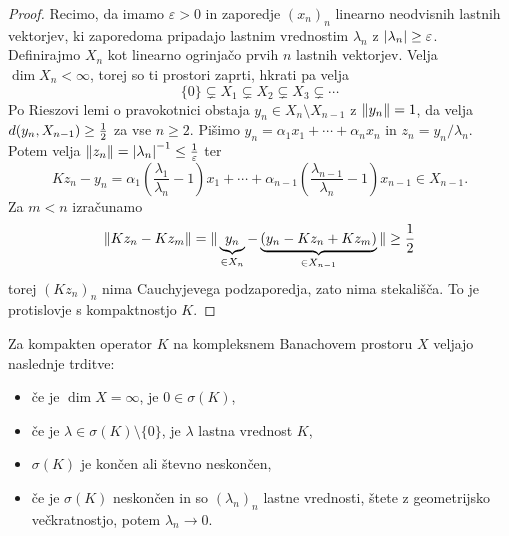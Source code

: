 \begin{proof}
  Recimo, da imamo $\varepsilon > 0$ in zaporedje $(x_n)_n$ linearno neodvisnih
  lastnih vektorjev, ki zaporedoma pripadajo lastnim vrednostim $\lambda_n$ z
  $\left| \lambda_n \right| \ge \varepsilon$.
  Definirajmo $X_n$ kot linearno ogrinjačo prvih $n$ lastnih vektorjev.
  Velja $\dim X_n < \infty$, torej so ti prostori zaprti, hkrati pa velja\
  \[
	\{0\} \subsetneq X_1 \subsetneq X_2 \subsetneq X_3 \subsetneq \cdots
  \]
  Po Rieszovi lemi o pravokotnici obstaja $y_n \in X_n \setminus X_{n-1}$ z
  $\left\lVert y_n\right\rVert = 1$, da velja $d(y_n, X_{n-1}) \ge \frac{1}{2}$ za vse $n \ge 2$.
  Pišimo $y_n = \alpha_1 x_1 + \cdots + \alpha_n x_n$ in $z_n = y_n /
  \lambda_n$.
  Potem velja $\left\lVert z_n\right\rVert = \left| \lambda_n \right|^{-1} \le \frac{1}{\varepsilon}$ ter
  \[
	K z_n - y_n
	= \alpha_1\left(\frac{\lambda_1}{\lambda_n} - 1\right) x_1
	+ \cdots + \alpha_{n-1} \left(\frac{\lambda_{n-1}}{\lambda_n} - 1\right)
	x_{n-1} \in X_{n-1}.
  \]
  Za $m < n$ izračunamo
  \[
	\left\lVert K z_n - K z_m\right\rVert
	= \| \underbrace{y_n}_{\in X_n} - \underbrace{(y_n - K z_n + K z_m)}_{\in
	  X_{n-1}} \|
	\ge \frac{1}{2}
  \]
  torej $(K z_n)_n$ nima Cauchyjevega podzaporedja, zato nima stekališča.
  To je protislovje s kompaktnostjo $K$.
\end{proof}

\begin{izrek}
  Za kompakten operator $K$ na kompleksnem Banachovem prostoru $X$ veljajo
  naslednje trditve:
  \begin{itemize}
  \item če je $\dim X = \infty$, je $0 \in \sigma(K)$,
  \item če je $\lambda \in \sigma(K) \setminus \{0\}$, je $\lambda$ lastna
	vrednost $K$,
  \item $\sigma(K)$ je končen ali števno neskončen,
  \item če je $\sigma(K)$ neskončen in so $(\lambda_n)_n$ lastne vrednosti,
	štete z geometrijsko večkratnostjo, potem $\lambda_n \to 0$.
  \end{itemize}
\end{izrek}

